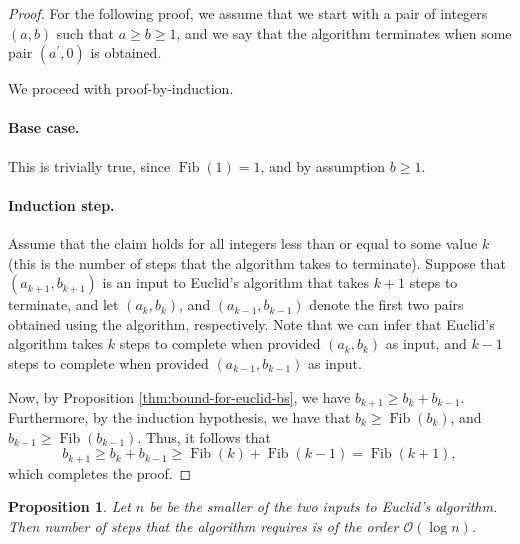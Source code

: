 \documentclass{article}
\newtheorem{proposition}{Proposition}
\DeclareMathOperator{\fib}{Fib}
\begin{document}
\begin{proof}
  For the following proof, we assume that we start with a pair of integers
  $(a, b)$ such that $a \geq b \geq 1$, and we say that the algorithm terminates
  when some pair $(a^{\prime}, 0)$ is obtained.

  We proceed with proof-by-induction.

  \paragraph{Base case.}  This is trivially true, since $\fib(1) = 1$, and by
  assumption $b \geq 1$.

  \paragraph{Induction step.}  Assume that the claim holds for all integers less
  than or equal to some value $k$ (this is the number of steps that the
  algorithm takes to terminate).  Suppose that $(a_{k + 1}, b_{k + 1})$ is an
  input to Euclid's algorithm that takes $k + 1$ steps to terminate, and let
  $(a_k, b_k)$, and $(a_{k - 1}, b_{k - 1})$ denote the first two pairs obtained
  using the algorithm, respectively.  Note that we can infer that Euclid's
  algorithm takes $k$ steps to complete when provided $(a_k, b_k)$ as input, and
  $k - 1$ steps to complete when provided $(a_{k - 1}, b_{k - 1})$ as input.

  Now, by Proposition \ref{thm:bound-for-euclid-bs}, we have
  $b_{k + 1} \geq b_k + b_{k - 1}$.  Furthermore, by the induction hypothesis,
  we have that $b_k \geq \fib(b_k)$, and $b_{k - 1} \geq \fib(b_{k - 1})$.
  Thus, it follows that
  \begin{equation*}
    b_{k + 1} \geq b_k + b_{k - 1} \geq \fib(k) + \fib(k - 1) = \fib(k +1),
  \end{equation*}
  which completes the proof.
\end{proof}
\vspace{5mm}



\begin{proposition}
  Let $n$ be be the smaller of the two inputs to Euclid's algorithm.  Then
  number of steps that the algorithm requires is of the order
  $\mathcal{O}(\log n)$.
\end{proposition}
\end{document}
